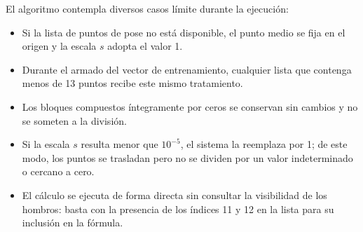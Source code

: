 El algoritmo contempla diversos casos límite durante la ejecución:
\begin{itemize}
    \item Si la lista de puntos de pose no está disponible, el punto medio se fija en el origen y la escala $s$ adopta el valor 1. 
    \item Durante el armado del vector de entrenamiento, cualquier lista que contenga menos de 13 puntos recibe este mismo tratamiento.
    \item Los bloques compuestos íntegramente por ceros se conservan sin cambios y no se someten a la división.
    \item Si la escala $s$ resulta menor que $10^{-5}$, el sistema la reemplaza por 1; de este modo, los puntos se trasladan pero no se dividen por un valor indeterminado o cercano a cero.
    \item El cálculo se ejecuta de forma directa sin consultar la visibilidad de los hombros: basta con la presencia de los índices 11 y 12 en la lista para su inclusión en la fórmula.
\end{itemize}

